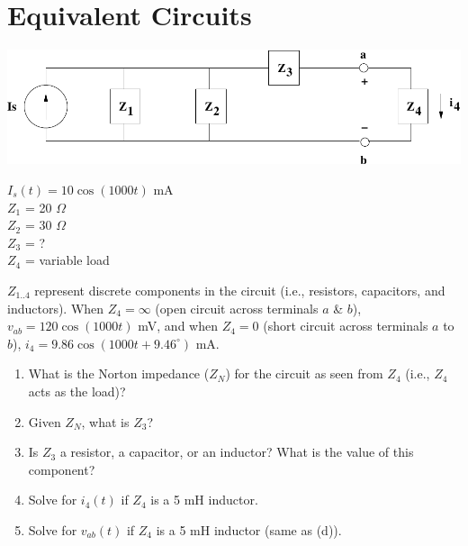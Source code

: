 \section{Equivalent Circuits}
\begin{minipage}[l]{0.7\linewidth}
\includegraphics[width=0.9\linewidth]{thevenin/thevenin}
\end{minipage}\hfill
\begin{minipage}[l]{0.3\linewidth}
$I_s(t) = 10 \cos(1000t)$ mA\\
$Z_1$ = 20 $\Omega$\\
$Z_2$ = 30 $\Omega$\\ 
$Z_3$ = ?\\ 
$Z_4$ = variable load\\
\end{minipage}

$Z_{1..4}$ represent discrete components in the circuit (i.e., resistors,
capacitors, and inductors).  When $Z_4 = \infty$ (open circuit across terminals
$a$ \& $b$), $v_{ab} = 120\cos(1000t)$ mV, and when $Z_4 = 0$ (short circuit
across terminals $a$ to $b$), $i_4 = 9.86\cos(1000t + 9.46^\circ)$ mA.

\begin{enumerate}
    \item What is the Norton impedance ($Z_N$) for the circuit as seen from
        $Z_4$ (i.e., $Z_4$ acts as the load)?

    \item Given $Z_N$, what is $Z_3$?

    \item Is $Z_3$ a resistor, a capacitor, or an inductor?  What is the value
        of this component? 

    \item Solve for $i_4(t)$ if $Z_4$ is a 5 mH inductor. 

    \item Solve for $v_{ab}(t)$ if $Z_4$ is a 5 mH inductor (same as (d)). 
\end{enumerate}
